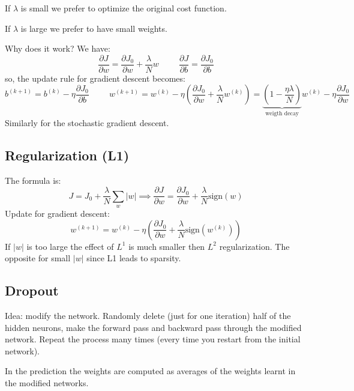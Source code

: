If $\lambda$ is small we prefer to optimize the original cost function.

If $\lambda$ is large we prefer to have small weights.

Why does it work? We have:
\[
    \dfrac{\partial J}{\partial w} = \dfrac{\partial J_0}{\partial w} + \dfrac{\lambda}{N} w \hspace{1cm} \dfrac{\partial J}{\partial b} = \dfrac{\partial J_0}{\partial b}    
\]
so, the update rule for gradient descent becomes:
\[
    b^{(k+1)} = b^{(k)} - \eta \dfrac{\partial J_0}{\partial b} \hspace{1cm} w^{(k+1)} = w^{(k)} - \eta \left(\dfrac{\partial J_0}{\partial w} + \dfrac{\lambda}{N} w^{(k)}\right) = \underbrace{\left(1-\dfrac{\eta \lambda}{N}\right)}_{\text{weigth decay}}w^{(k)} - \eta \dfrac{\partial J_0}{\partial w}    
\]
Similarly for the stochastic gradient descent.

\subsection{Regularization (L1)}
The formula is:
\[
    J = J_0 + \dfrac{\lambda}{N}\sum_w |w| \implies \dfrac{\partial J}{\partial w} = \dfrac{\partial J_0}{\partial w} + \dfrac{\lambda}{N} \text{sign}(w)    
\]
Update for gradient descent:
\[
    w^{(k+1)} = w^{(k)} - \eta \left(\dfrac{\partial J_0}{\partial w} + \dfrac{\lambda}{N} \text{sign}(w^{(k)})\right)
\]
If $|w|$ is too large the effect of $L^1$ is much smaller then $L^2$ regularization. The opposite for small $|w|$ since L1 leads to sparsity.\\

\subsection{Dropout}
Idea: modify the network. Randomly delete (just for one iteration) half of the hidden neurons, make the forward pass and backward pass through the modified network. Repeat the process many times (every time you restart from the initial network).

In the prediction the weights are computed as averages of the weights learnt in the modified networks.\\